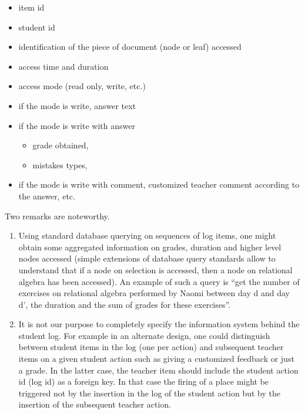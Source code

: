 \begin{itemize}
\item item id
\item student id
\item identification of the piece of document (node or leaf) accessed
\item access time and duration
\item access mode (read only, write, etc.)
\item if the mode is write, answer text
\item if the mode is write with answer
  \begin{itemize}
  \item  grade obtained,
  \item  mistakes types,
  \end{itemize}
\item  if the mode is write with comment, customized teacher comment
  according to the answer,
etc.
\end{itemize}

Two remarks are noteworthy.

\begin{enumerate}

  \item Using standard database querying on sequences of log items,
  one might obtain some aggregated information on grades, duration and
  higher level nodes accessed (simple extensions of database query
  standards allow to understand that if a node on selection is
  accessed, then a node on relational algebra has been accessed). An
  example of such a query is ``get the number of exercises on
  relational algebra performed by Naomi between day d and day d', the
  duration and the sum of grades for these exercises''.

  \item It is not our purpose to completely specify the information
  system behind the student log. For example in an alternate design,
  one could distinguish between student items in the log (one per
  action) and subsequent teacher items on a given student action such
  as giving a customized feedback or just a grade. In the latter case,
  the teacher item should include the student action id (log id) as a
  foreign key. In that case the firing of a place might be triggered
  not by the insertion in the log of the student action but by the
  insertion of the subsequent teacher action.

\end{enumerate}

